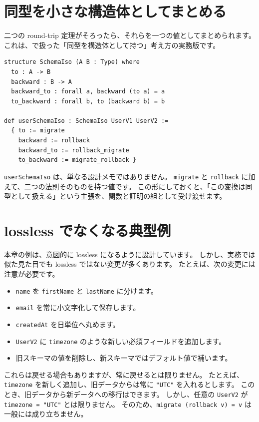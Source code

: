 \section{同型を小さな構造体としてまとめる}

二つの round-trip 定理がそろったら、それらを一つの値としてまとめられます。
これは、で扱った「同型を構造体として持つ」考え方の実務版です。

\begin{listing}[htbp]
\begin{verbatim}
structure SchemaIso (A B : Type) where
  to : A -> B
  backward : B -> A
  backward_to : forall a, backward (to a) = a
  to_backward : forall b, to (backward b) = b

def userSchemaIso : SchemaIso UserV1 UserV2 :=
  { to := migrate
    backward := rollback
    backward_to := rollback_migrate
    to_backward := migrate_rollback }
\end{verbatim}
\caption{\texttt{SchemaIso}}
\label{lst:ch28-schema-iso}
\end{listing}

\texttt{userSchemaIso} は、単なる設計メモではありません。
\texttt{migrate} と \texttt{rollback} に加えて、二つの法則そのものを持つ値です。
この形にしておくと、「この変換は同型として扱える」という主張を、関数と証明の組として受け渡せます。

\section{lossless でなくなる典型例}

本章の例は、意図的に lossless になるように設計しています。
しかし、実務では似た見た目でも lossless ではない変更が多くあります。
たとえば、次の変更には注意が必要です。

\begin{itemize}
\item \texttt{name} を \texttt{firstName} と \texttt{lastName} に分けます。
\item \texttt{email} を常に小文字化して保存します。
\item \texttt{createdAt} を日単位へ丸めます。
\item \texttt{UserV2} に \texttt{timezone} のような新しい必須フィールドを追加します。
\item 旧スキーマの値を削除し、新スキーマではデフォルト値で補います。
\end{itemize}

これらは戻せる場合もありますが、常に戻せるとは限りません。
たとえば、\texttt{timezone} を新しく追加し、旧データからは常に \texttt{"UTC"} を入れるとします。
このとき、旧データから新データへの移行はできます。
しかし、任意の \texttt{UserV2} が \texttt{timezone = "UTC"} とは限りません。
そのため、\texttt{migrate (rollback v) = v} は一般には成り立ちません。

